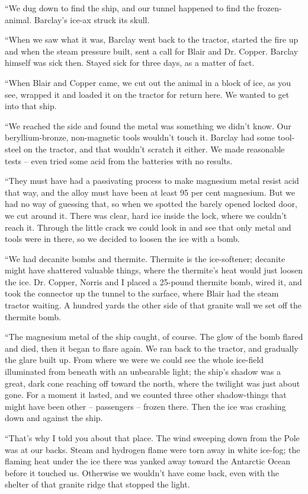 \documentclass[letterpaper,openany,12pt]{memoir}		%
\begin{document}
``We dug down to find the ship, and our tunnel happened to find the
frozen-animal. Barclay's ice-ax struck its skull.

``When we saw what it was, Barclay went back to the tractor, started the fire up
and when the steam pressure built, sent a call for Blair and Dr. Copper. Barclay
himself was sick then. Stayed sick for three days, as a matter of fact.

``When Blair and Copper came, we cut out the animal in a block of ice, as you
see, wrapped it and loaded it on the tractor for return here. We wanted to get
into that ship.

``We reached the side and found the metal was something we didn't know. Our
beryllium-bronze, non-magnetic tools wouldn't touch it. Barclay had some
tool-steel on the tractor, and that wouldn't scratch it either. We made
reasonable tests -- even tried some acid from the batteries with no results.

``They must have had a passivating process to make magnesium metal resist acid
that way, and the alloy must have been at least 95 per cent magnesium. But we
had no way of guessing that, so when we spotted the barely opened locked door,
we cut around it. There was clear, hard ice inside the lock, where we couldn't
reach it. Through the little crack we could look in and see that only metal and
tools were in there, so we decided to loosen the ice with a bomb.

``We had decanite bombs and thermite. Thermite is the ice-softener; decanite
might have shattered valuable things, where the thermite's heat would just
loosen the ice. Dr. Copper, Norris and I placed a 25-pound thermite bomb, wired
it, and took the connector up the tunnel to the surface, where Blair had the
steam tractor waiting. A hundred yards the other side of that granite wall we
set off the thermite bomb.

``The magnesium metal of the ship caught, of course. The glow of the bomb flared
and died, then it began to flare again. We ran back to the tractor, and
gradually the glare built up. From where we were we could see the whole
ice-field illuminated from beneath with an unbearable light; the ship's shadow
was a great, dark cone reaching off toward the north, where the twilight was
just about gone. For a moment it lasted, and we counted three other
shadow-things that might have been other -- passengers -- frozen there. Then the
ice was crashing down and against the ship.

``That's why I told you about that place. The wind sweeping down from the Pole
was at our backs. Steam and hydrogen flame were torn away in white ice-fog; the
flaming heat under the ice there was yanked away toward the Antarctic Ocean
before it touched us. Otherwise we wouldn't have come back, even with the
shelter of that granite ridge that stopped the light.
\end{document}

